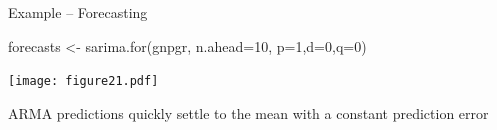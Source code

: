 \documentclass[ignorenonframetext,xcolor=x11names]{beamer}
\begin{document}
\begin{frame}[fragile]{Example -- Forecasting}
\begin{Rcode}
forecasts <- sarima.for(gnpgr, n.ahead=10, p=1,d=0,q=0)
\end{Rcode}
\begin{center}
\texttt{[image: figure21.pdf]}
\end{center}
\vspace{-\baselineskip}
\begin{block}{}
\centering \small
ARMA predictions quickly settle to the mean with a constant prediction error
\end{block}
\end{frame}





\end{document}
